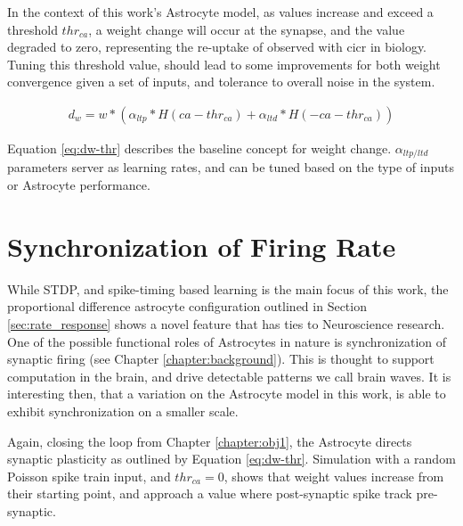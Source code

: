 In the context of this work's Astrocyte model, as \ca values increase and exceed
a threshold $thr_{ca}$, a weight change will occur at the synapse, and the \ca
value degraded to zero, representing the re-uptake of \ca observed with \Gls{cicr} in
biology. Tuning this threshold value, should lead to some improvements for both
weight convergence given a set of inputs, and tolerance to overall noise in the
system.

\begin{align}
  d_w = w * (\alpha_{ltp} * H(ca - thr_{ca}) + \alpha_{ltd} * H(-ca - thr_{ca}))  \label{eq:dw-thr}
\end{align}

Equation \ref{eq:dw-thr} describes the baseline concept for weight
change. $\alpha_{ltp/ltd}$ parameters server as learning rates, and can be tuned
based on the type of inputs or Astrocyte performance.


\section{Synchronization of Firing Rate}
While STDP, and spike-timing based learning is the main focus of this work, the
proportional difference astrocyte configuration outlined in Section
\ref{sec:rate_response} shows a novel feature that has ties to Neuroscience
research. One of the possible functional roles of Astrocytes in nature is
synchronization of synaptic firing (see Chapter \ref{chapter:background}). This
is thought to support computation in the brain, and drive detectable patterns we
call brain waves. It is interesting then, that a variation on the Astrocyte
model in this work, is able to exhibit synchronization on a smaller scale.

Again, closing the loop from Chapter \ref{chapter:obj1}, the Astrocyte directs
synaptic plasticity as outlined by Equation \ref{eq:dw-thr}. Simulation with a
random Poisson spike train input, and $thr_{ca}=0$, shows that weight values
increase from their starting point, and approach a value where post-synaptic
spike track pre-synaptic.



